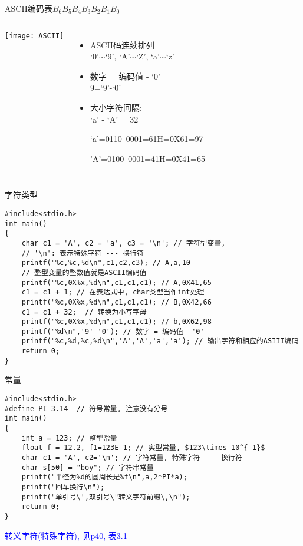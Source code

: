 \note{
	\begin{lstlisting}
	printf("%d,%x,%X\n",-25,-25,-25); // -25,ffffffe7,FFFFFFE7
	printf("%d,%x,%X\n",-77,-77,-77); // -77,ffffffb3,FFFFFFB3}
	\end{lstlisting}
}

\begin{frame}{ASCII编码表$B_6B_5B_4B_3B_2B_1B_0$}
\begin{columns}
	\texttt{[image: ASCII]}
	\begin{itemize}
		\item ASCII码连续排列 \\
		`0'$\sim$`9', `A'$\sim$`Z', `a'$\sim$`z'
		\item 数字 = 编码值 - `0' \\
		9=`9'-`0'
		\item 大小字符间隔: \\
		`a' - `A' = 32
		
		\scriptsize{
			`a'=0110~0001=61H=0X61=97
			
			'A'=0100~0001=41H=0X41=65}
	\end{itemize}	
\end{columns}
\end{frame}

\begin{frame}{字符类型}
\begin{lstlisting}
#include<stdio.h>           
int main()                   
{                            
	char c1 = 'A', c2 = 'a', c3 = '\n'; // 字符型变量, 
	// '\n': 表示特殊字符 --- 换行符
	printf("%c,%c,%d\n",c1,c2,c3); // A,a,10
	// 整型变量的整数值就是ASCII编码值
	printf("%c,0X%x,%d\n",c1,c1,c1); // A,0X41,65
	c1 = c1 + 1; // 在表达式中, char类型当作int处理
	printf("%c,0X%x,%d\n",c1,c1,c1); // B,0X42,66
	c1 = c1 + 32;  // 转换为小写字母
	printf("%c,0X%x,%d\n",c1,c1,c1); // b,0X62,98
	printf("%d\n",'9'-'0'); // 数字 = 编码值- '0'
	printf("%c,%d,%c,%d\n",'A','A','a','a'); // 输出字符和相应的ASIII编码
	return 0;           
}                            
\end{lstlisting}
\end{frame}


\begin{frame}{常量}
\vspace{-0.2cm}
\begin{lstlisting}
#include<stdio.h> 
#define PI 3.14  // 符号常量, 注意没有分号           
int main()                   
{                                  
	int a = 123; // 整型常量
	float f = 12.2, f1=123E-1; // 实型常量, $123\times 10^{-1}$
	char c1 = 'A', c2='\n'; // 字符常量, 特殊字符 --- 换行符
	char s[50] = "boy"; // 字符串常量
	printf("半径为%d的圆周长是%f\n",a,2*PI*a);       
	printf("回车换行\n");
	printf("单引号\',双引号\"转义字符前缀\,\n");  
	return 0;           
}                            
\end{lstlisting}
\textcolor{blue}{转义字符(特殊字符), 见p40, 表3.1}
\end{frame}

